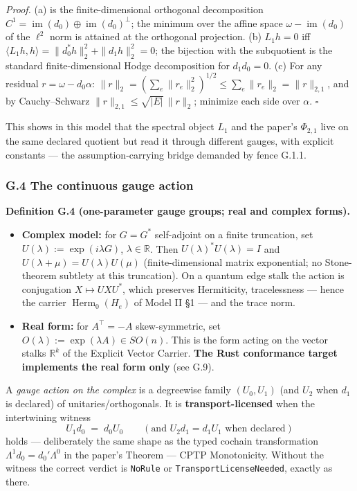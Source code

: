 \documentclass[
  11pt,
]{article}
\providecommand{\tightlist}{%
  \setlength{\itemsep}{0pt}\setlength{\parskip}{0pt}}
\providecommand{\tightlist}{%
  \setlength{\itemsep}{0pt}\setlength{\parskip}{0pt}}
\begin{document}
\emph{Proof.} (a) is the finite-dimensional orthogonal decomposition \(C^1=\operatorname{im}(d_0)\oplus\operatorname{im}(d_0)^\perp\); the minimum over the affine space \(\omega-\operatorname{im}(d_0)\) of the \(\ell^2\) norm is attained at the orthogonal projection. (b) \(L_1h=0\) iff \(\langle L_1h,h\rangle=\|d_0^*h\|_2^2+\|d_1h\|_2^2=0\); the bijection with the subquotient is the standard finite-dimensional Hodge decomposition for \(d_1d_0=0\). (c) For any residual \(r=\omega-d_0\alpha\): \(\|r\|_2=(\sum_e\|r_e\|_2^2)^{1/2}\le\sum_e\|r_e\|_2=\|r\|_{2,1}\), and by Cauchy--Schwarz \(\|r\|_{2,1}\le\sqrt{|E|}\,\|r\|_2\); minimize each side over \(\alpha\). \(\square\)

This shows in this model that the spectral object \(L_1\) and the paper's \(\Phi_{2,1}\) live on the same declared quotient but read it through different gauges, with explicit constants --- the assumption-carrying bridge demanded by fence G.1.1.

\subsubsection{G.4 The continuous gauge action}\label{g.4-the-continuous-gauge-action}

\textbf{Definition G.4 (one-parameter gauge groups; real and complex forms).}

\begin{itemize}
\tightlist
\item
  \textbf{Complex model:} for \(G=G^*\) self-adjoint on a finite truncation, set \(U(\lambda):=\exp(i\lambda G)\), \(\lambda\in\mathbb R\). Then \(U(\lambda)^*U(\lambda)=I\) and \(U(\lambda+\mu)=U(\lambda)U(\mu)\) (finite-dimensional matrix exponential; no Stone-theorem subtlety at this truncation). On a quantum edge stalk the action is conjugation \(X\mapsto U X U^*\), which preserves Hermiticity, tracelessness --- hence the carrier \(\operatorname{Herm}_0(H_e)\) of Model II §1 --- and the trace norm.
\item
  \textbf{Real form:} for \(A^\top=-A\) skew-symmetric, set \(O(\lambda):=\exp(\lambda A)\in SO(n)\). This is the form acting on the vector stalks \(\mathbb R^k\) of the Explicit Vector Carrier. \textbf{The Rust conformance target implements the real form only} (see G.9).
\end{itemize}

A \emph{gauge action on the complex} is a degreewise family \((U_0,U_1)\) (and \(U_2\) when \(d_1\) is declared) of unitaries/orthogonals. It is \textbf{transport-licensed} when the intertwining witness
\[U_1 d_0 \;=\; d_0 U_0 \qquad(\text{and } U_2 d_1 = d_1 U_1 \text{ when declared})\]
holds --- deliberately the same shape as the typed cochain transformation \(\Lambda^1d_0=d_0'\Lambda^0\) in the paper's Theorem --- CPTP Monotonicity. Without the witness the correct verdict is \texttt{NoRule} or \texttt{TransportLicenseNeeded}, exactly as there.
\end{document}
